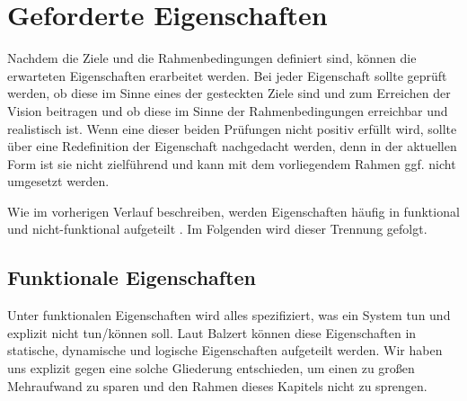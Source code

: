 \section{Geforderte Eigenschaften}
Nachdem die Ziele und die Rahmenbedingungen definiert sind, können die erwarteten Eigenschaften erarbeitet werden. Bei jeder Eigenschaft sollte geprüft werden, ob diese im Sinne eines der gesteckten Ziele sind und zum Erreichen der Vision beitragen und ob diese im Sinne der Rahmenbedingungen erreichbar und realistisch ist. Wenn eine dieser beiden Prüfungen nicht positiv erfüllt wird, sollte über eine Redefinition der Eigenschaft nachgedacht werden, denn in der aktuellen Form ist sie nicht zielführend und kann mit dem vorliegendem Rahmen ggf. nicht umgesetzt werden.

\vspace{0.25cm}

Wie im vorherigen Verlauf beschreiben, werden Eigenschaften häufig in funktional und nicht-funktional aufgeteilt \cite{Balzert.2009}. Im Folgenden wird dieser Trennung gefolgt.

\subsection{Funktionale Eigenschaften}\label{sec:funcReq}
Unter funktionalen Eigenschaften wird alles spezifiziert, was ein System tun und explizit nicht tun/können soll. Laut Balzert können diese Eigenschaften in statische, dynamische und logische Eigenschaften aufgeteilt werden\cite{Balzert.2009}. Wir haben uns explizit gegen eine solche Gliederung entschieden, um einen zu großen Mehraufwand zu sparen und den Rahmen dieses Kapitels nicht zu sprengen.

\vspace{0.25cm}

